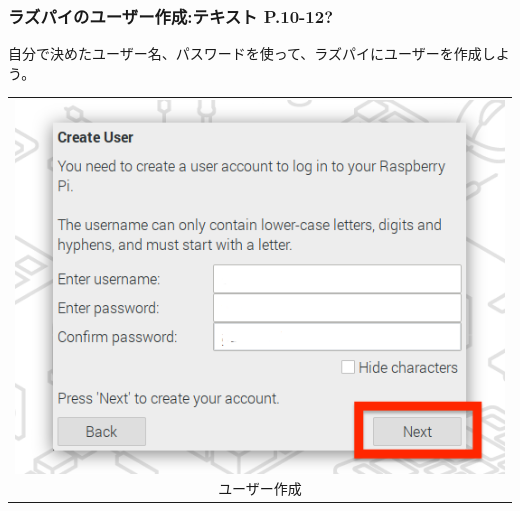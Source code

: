 \documentclass[dvipdfmx]{beamer}
\begin{document}
\begin{frame}[fragile]
	\frametitle{ラズパイのユーザー作成:テキスト P.10-12?~~~}

	自分で決めたユーザー名、パスワードを使って、ラズパイにユーザーを作成しよう。
	\vfill
	\begin{tabular}{c}
		\begin{minipage}{0.32\textwidth}
                {\upshape
                  \includegraphics[width=\textwidth]{sw_image03.png}
                  \newline
                  ユーザー作成}
              \end{minipage}
	\end{tabular}


\end{frame}
\end{document}
